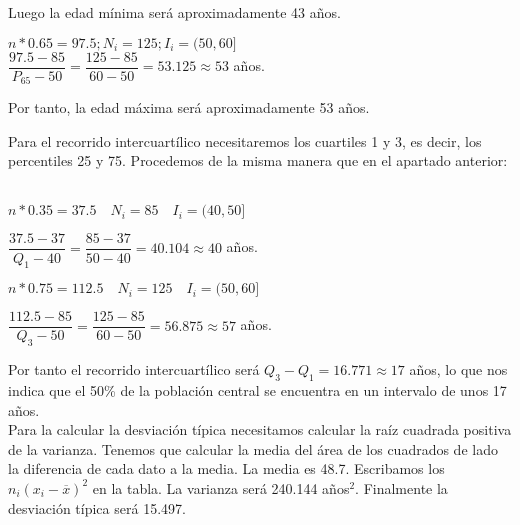 Luego la edad mínima será aproximadamente 43 años.

\begin{center}
	$n*0.65 = 97.5; N_i = 125 ; I_i = (50, 60]$\\
	$\dfrac{97.5-85}{P_{65}-50} = \dfrac{125-85}{60-50} = 53.125
	\approx 53$ años.
\end{center}

Por tanto, la edad máxima será aproximadamente 53 años.\\


\subproblem

Para el recorrido intercuartílico necesitaremos los cuartiles 1 y 3, es decir, los percentiles 25 y 75. Procedemos de la misma manera que en el apartado anterior:\\ \\ 

\begin{center}
	$n*0.35 = 37.5\quad  N_i = 85\quad  I_i = (40, 50]$\\
\end{center}

\begin{center}
	$\dfrac{37.5-37}{Q_{1}-40} = \dfrac{85-37}{50-40} = 40.104
	\approx 40$ años.
\end{center}

\begin{center}
	$n*0.75 = 112.5\quad  N_i = 125 \quad  I_i = (50, 60]$\\
	
\end{center}

\begin{center}
	$\dfrac{112.5-85}{Q_{3}-50} = \dfrac{125-85}{60-50} = 56.875
	\approx 57$ años.
\end{center}

Por tanto el recorrido intercuartílico será $Q_3-Q_1 = 16.771 \approx 17$ años, lo que nos indica que el 50\% de la población central se encuentra en un intervalo de unos 17 años.\\

Para la calcular la desviación típica necesitamos calcular la raíz cuadrada positiva de la varianza. Tenemos que calcular la media del área de los cuadrados de lado la diferencia de cada dato a la media. La media es 48.7. Escribamos los $n_i(x_i-\overline{x})^2$ en la tabla. La varianza será 240.144 años$^2$. Finalmente la desviación típica será 15.497.


\subproblem

